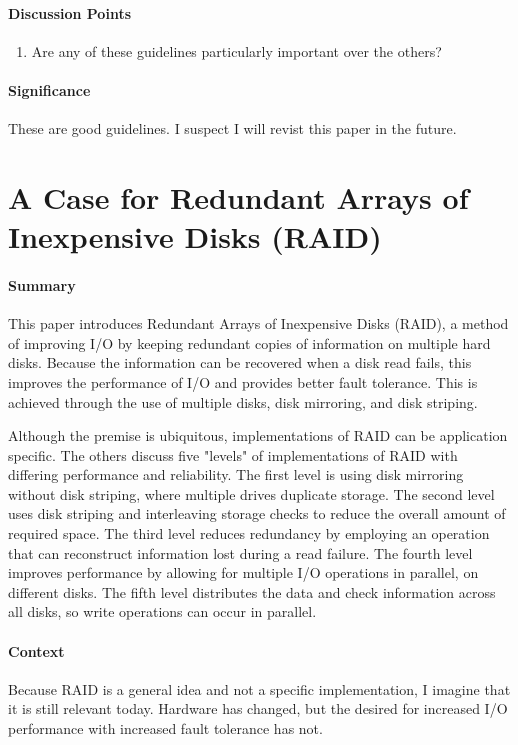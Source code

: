 \paragraph{\textbf{Discussion Points}}
\begin{enumerate}
    \item Are any of these guidelines particularly important over the others?
\end{enumerate}

\paragraph{\textbf{Significance}}
These are good guidelines. I suspect I will revist this paper in the future.

\section {A Case for Redundant Arrays of Inexpensive Disks (RAID) \cite{patterson1988case}}

\paragraph{\textbf{Summary}}
This paper introduces Redundant Arrays of Inexpensive Disks (RAID), a method of
improving I/O by keeping redundant copies of information on multiple hard disks.
Because the information can be recovered when a disk read fails, this improves
the performance of I/O and provides better fault tolerance. This is achieved
through the use of multiple disks, disk mirroring, and disk striping.

Although the premise is ubiquitous, implementations of RAID can be application
specific. The others discuss five "levels" of implementations of RAID with
differing performance and reliability. The first level is using disk mirroring
without disk striping, where multiple drives duplicate storage. The second level
uses disk striping and interleaving storage checks to reduce the overall amount
of required space. The third level reduces redundancy by employing an operation
that can reconstruct information lost during a read failure. The fourth level
improves performance by allowing for multiple I/O operations in parallel, on
different disks. The fifth level distributes the data and check information
across all disks, so write operations can occur in parallel.

\paragraph{\textbf{Context}}
Because RAID is a general idea and not a specific implementation, I imagine that
it is still relevant today. Hardware has changed, but the desired for increased
I/O performance with increased fault tolerance has not.

